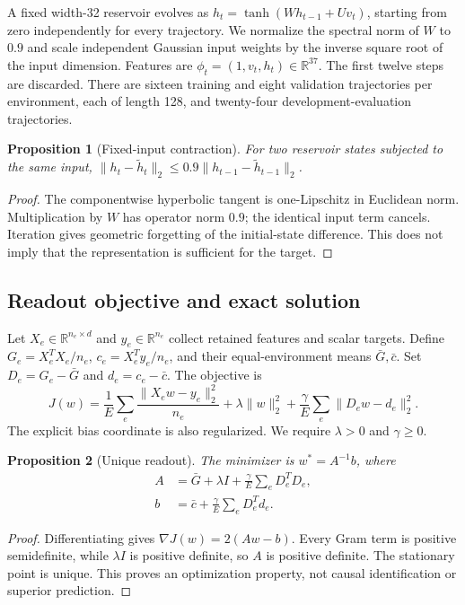 \documentclass[10pt]{article}
\newtheorem{proposition}{Proposition}
\newcommand{\R}{\mathbb{R}}
\begin{document}
A fixed width-32 reservoir evolves as $h_t=\tanh(Wh_{t-1}+Uv_t)$, starting from zero independently for every trajectory. We normalize the spectral norm of $W$ to $0.9$ and scale independent Gaussian input weights by the inverse square root of the input dimension. Features are $\phi_t=(1,v_t,h_t)\in\R^{37}$. The first twelve steps are discarded. There are sixteen training and eight validation trajectories per environment, each of length 128, and twenty-four development-evaluation trajectories.

\begin{proposition}[Fixed-input contraction]
For two reservoir states subjected to the same input, $\|h_t-\tilde h_t\|_2\leq0.9\|h_{t-1}-\tilde h_{t-1}\|_2$.
\end{proposition}
\begin{proof}
The componentwise hyperbolic tangent is one-Lipschitz in Euclidean norm. Multiplication by $W$ has operator norm $0.9$; the identical input term cancels. Iteration gives geometric forgetting of the initial-state difference. This does not imply that the representation is sufficient for the target.
\end{proof}

\subsection{Readout objective and exact solution}
Let $X_e\in\R^{n_e\times d}$ and $y_e\in\R^{n_e}$ collect retained features and scalar targets. Define $G_e=X_e^TX_e/n_e$, $c_e=X_e^Ty_e/n_e$, and their equal-environment means $\bar G,\bar c$. Set $D_e=G_e-\bar G$ and $d_e=c_e-\bar c$. The objective is
\begin{equation}
 J(w)=\frac1E\sum_e\frac{\|X_ew-y_e\|_2^2}{n_e}
       +\lambda\|w\|_2^2+\frac\gamma E\sum_e\|D_ew-d_e\|_2^2.
\end{equation}
The explicit bias coordinate is also regularized. We require $\lambda>0$ and $\gamma\geq0$.

\begin{proposition}[Unique readout]
The minimizer is $w^*=A^{-1}b$, where
\begin{align}
 A&=\bar G+\lambda I+\frac\gamma E\sum_e D_e^TD_e,\\
 b&=\bar c+\frac\gamma E\sum_e D_e^Td_e.
\end{align}
\end{proposition}
\begin{proof}
Differentiating gives $\nabla J(w)=2(Aw-b)$. Every Gram term is positive semidefinite, while $\lambda I$ is positive definite, so $A$ is positive definite. The stationary point is unique. This proves an optimization property, not causal identification or superior prediction.
\end{proof}
\end{document}
